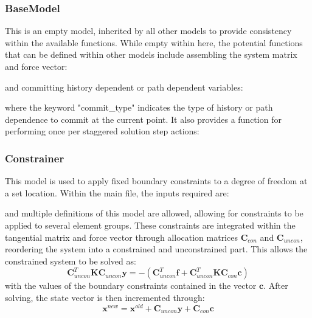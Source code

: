 \documentclass[3p]{elsarticle} %
\begin{document}
\subsubsection{BaseModel}
This is an empty model, inherited by all other models to provide consistency within the available functions. While empty within here, the potential functions that can be defined within other models include assembling the system matrix and force vector:

and committing history dependent or path dependent variables:

where the keyword "commit{\_}type" indicates the type of history or path dependence to commit at the current point. 
It also provides a function for performing once per staggered solution step actions:



\subsubsection{Constrainer}
This model is used to apply fixed boundary constraints to a degree of freedom at a set location. Within the main file, the inputs required are:

and multiple definitions of this model are allowed, allowing for constraints to be applied to several element groups. These constraints are integrated within the tangential matrix and force vector through  allocation matrices $\bm{C}_{con}$ and $\bm{C}_{uncon}$, reordering the system into a constrained and unconstrained part. This allows the constrained system to be solved as:
\begin{equation}
	\bm{C}_{uncon}^T \bm{K} \bm{C}_{uncon} \mathbf{y} = -\left(\bm{C}_{uncon}^T\bm{f}+\bm{C}_{uncon}^T \bm{K} \bm{C}_{con}\mathbf{c}\right)
\end{equation}
with the values of the boundary constraints contained in the vector $\mathbf{c}$. After solving, the state vector is then incremented through:
\begin{equation}
	\mathbf{x}^{new} = \mathbf{x}^{old} + \bm{C}_{uncon}\mathbf{y} + \bm{C}_{con}\mathbf{c}
\end{equation}
\end{document}
